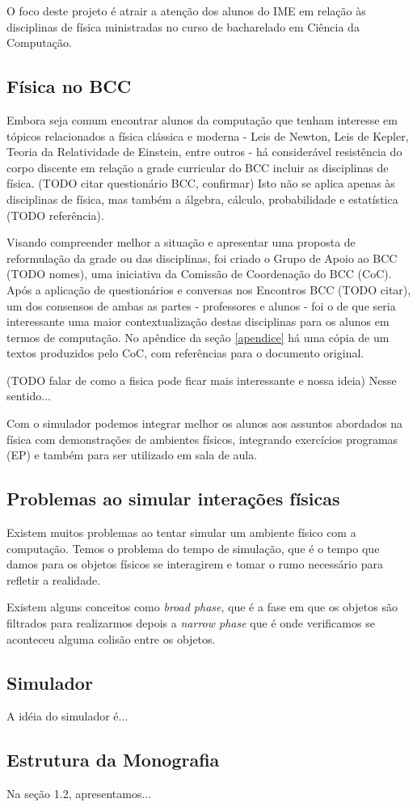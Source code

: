 
O foco deste projeto é atrair a atenção dos alunos do IME em relação às disciplinas de física ministradas no curso de bacharelado em Ciência da Computação.

\subsection{Física no BCC}
Embora seja comum encontrar alunos da computação que tenham interesse em tópicos relacionados a física clássica e moderna - Leis de Newton, Leis de Kepler, Teoria da Relatividade de Einstein, entre outros - há considerável resistência do corpo discente em relação a grade curricular do BCC incluir as disciplinas de física. (TODO citar questionário BCC, confirmar) Isto não se aplica apenas às disciplinas de física, mas também a álgebra, cálculo, probabilidade e estatística (TODO referência).

Visando compreender melhor a situação e apresentar uma proposta de reformulação da grade ou das disciplinas, foi criado o Grupo de Apoio ao BCC (TODO nomes), uma iniciativa da Comissão de Coordenação do BCC (CoC). Após a aplicação de questionários e conversas nos Encontros BCC (TODO citar), um dos consensos de ambas as partes - professores e alunos - foi o de que seria interessante uma maior contextualização destas disciplinas para os alunos em termos de computação. No apêndice da seção \ref{apendice} há uma cópia de um textos produzidos pelo CoC, com referências para o documento original. 

(TODO falar de como a fisica pode ficar mais interessante e nossa ideia)
Nesse sentido... 

Com o simulador podemos integrar melhor os alunos aos assuntos abordados na física com demonstrações de ambientes físicos, 
integrando exercícios programas (EP) e também para ser utilizado em sala de aula.

\subsection{Problemas ao simular interações físicas}

Existem muitos problemas ao tentar simular um ambiente físico com a computação. Temos o problema do tempo de simulação, 
que é o tempo que damos para os objetos físicos se interagirem e tomar o rumo necessário para refletir a realidade.

Existem alguns conceitos como \textit{broad phase}, que é a fase em que os objetos são filtrados para realizarmos depois a \textit{narrow phase} que é onde verificamos se aconteceu alguma colisão entre os objetos.

\subsection{Simulador}

A idéia do simulador é... 

\subsection{Estrutura da Monografia}

Na seção 1.2, apresentamos...
